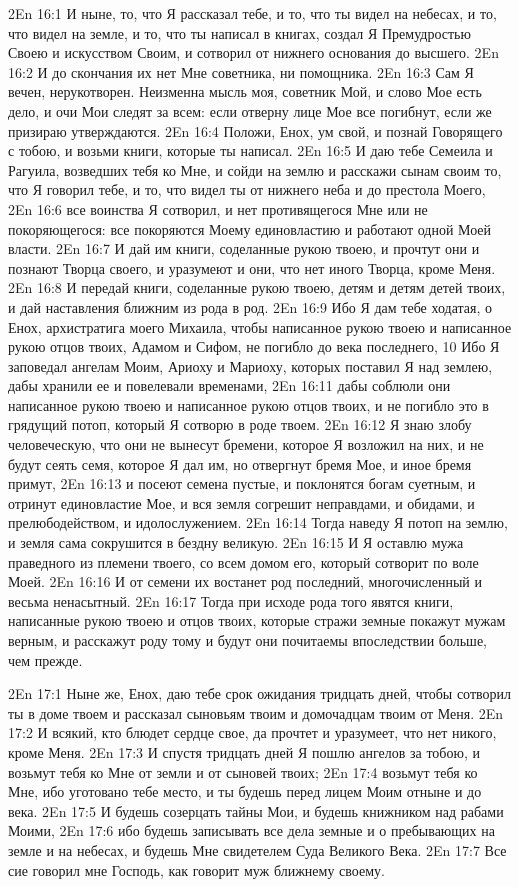 \vs 2En 16:1
И ныне, то, что Я рассказал тебе, и то, что ты видел на небесах, и то, что видел на земле, и то, что ты написал в книгах, создал Я Премудростью Своею и искусством Своим, и сотворил от нижнего основания до высшего.
\vs 2En 16:2
И до скончания их нет Мне советника, ни помощника.
\vs 2En 16:3
Сам Я вечен, нерукотворен. Неизменна мысль моя, советник Мой, и слово Мое есть дело, и очи Мои следят за всем: если отверну лице Мое все погибнут, если же призираю утверждаются.
\vs 2En 16:4
Положи, Енох, ум свой, и познай Говорящего с тобою, и возьми книги, которые ты написал.
\vs 2En 16:5
И даю тебе Семеила и Рагуила, возведших тебя ко Мне, и сойди на землю и расскажи сынам своим то, что Я говорил тебе, и то, что видел ты от нижнего неба и до престола Моего,
\vs 2En 16:6
все воинства Я сотворил, и нет противящегося Мне или не покоряющегося: все покоряются Моему единовластию и работают одной Моей власти.
\vs 2En 16:7
И дай им книги, соделанные рукою твоею, и прочтут они и познают Творца своего, и уразумеют и они, что нет иного Творца, кроме Меня.
\vs 2En 16:8
И передай книги, соделанные рукою твоею, детям и детям детей твоих, и дай наставления ближним из рода в род.
\vs 2En 16:9
Ибо Я дам тебе ходатая, о Енох, архистратига моего Михаила, чтобы написанное рукою твоею и написанное рукою отцов твоих, Адамом и Сифом, не погибло до века последнего, 10 Ибо Я заповедал ангелам Моим, Ариоху и Мариоху, которых поставил Я над землею, дабы хранили ее и повелевали временами,
\vs 2En 16:11
дабы соблюли они написанное рукою твоею и написанное рукою отцов твоих, и не погибло это в грядущий потоп, который Я сотворю в роде твоем.
\vs 2En 16:12
Я знаю злобу человеческую, что они не вынесут бремени, которое Я возложил на них, и не будут сеять семя, которое Я дал им, но отвергнут бремя Мое, и иное бремя примут,
\vs 2En 16:13
и посеют семена пустые, и поклонятся богам суетным, и отринут единовластие Мое, и вся земля согрешит неправдами, и обидами, и прелюбодейством, и идолослужением.
\vs 2En 16:14
Тогда наведу Я потоп на землю, и земля сама сокрушится в бездну великую.
\vs 2En 16:15
И Я оставлю мужа праведного из племени твоего, со всем домом его, который сотворит по воле Моей.
\vs 2En 16:16
И от семени их востанет род последний, многочисленный и весьма ненасытный.
\vs 2En 16:17
Тогда при исходе рода того явятся книги, написанные рукою твоею и отцов твоих, которые стражи земные покажут мужам верным, и расскажут роду тому и будут они почитаемы впоследствии больше, чем прежде.

\vs 2En 17:1
Ныне же, Енох, даю тебе срок ожидания тридцать дней, чтобы сотворил ты в доме твоем и рассказал сыновьям твоим и домочадцам твоим от Меня.
\vs 2En 17:2
И всякий, кто блюдет сердце свое, да прочтет и уразумеет, что нет никого, кроме Меня.
\vs 2En 17:3
И спустя тридцать дней Я пошлю ангелов за тобою, и возьмут тебя ко Мне от земли и от сыновей твоих;
\vs 2En 17:4
возьмут тебя ко Мне, ибо уготовано тебе место, и ты будешь перед лицем Моим отныне и до века.
\vs 2En 17:5
И будешь созерцать тайны Мои, и будешь книжником над рабами Моими,
\vs 2En 17:6
ибо будешь записывать все дела земные и о пребывающих на земле и на небесах, и будешь Мне свидетелем Суда Великого Века.
\vs 2En 17:7
Все сие говорил мне Господь, как говорит муж ближнему своему.

